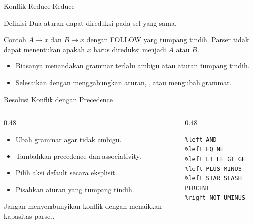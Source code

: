 \documentclass[aspectratio=169,10pt,t]{beamer}
\begin{document}
\begin{frame}{Konflik Reduce-Reduce}
  \begin{block}{Definisi}
    \small
    Dua aturan dapat direduksi pada sel yang sama.
  \end{block}

  \begin{exampleblock}{Contoh}
    \footnotesize
    \(A \to x\) dan \(B \to x\) dengan FOLLOW yang tumpang tindih.
    Parser tidak dapat menentukan apakah \(x\) harus direduksi menjadi
    \(A\) atau \(B\).
  \end{exampleblock}

  \begin{itemize}
    \item Biasanya menandakan grammar terlalu ambigu atau aturan
          tumpang tindih.
    \item Selesaikan dengan menggabungkan aturan, ,
          atau mengubah grammar.
  \end{itemize}
\end{frame}

\begin{frame}[fragile]{Resolusi Konflik dengan Precedence}
  \begin{columns}[T,onlytextwidth]
    \begin{column}{0.48\textwidth}
      \begin{itemize}
        \item Ubah grammar agar tidak ambigu.
        \item Tambahkan precedence dan associativity.
        \item Pilih aksi default secara eksplisit.
        \item Pisahkan aturan yang tumpang tindih.
      \end{itemize}
      \vspace{2pt}
      {\footnotesize\color{ubbblue!80}Jangan menyembunyikan konflik
      dengan menaikkan kapasitas parser.}
    \end{column}
    \begin{column}{0.48\textwidth}
      \begin{lstlisting}[language=Bison,numbers=none,
        caption={Deklarasi precedence pada Bison}]
%left OR
%left AND
%left EQ NE
%left LT LE GT GE
%left PLUS MINUS
%left STAR SLASH PERCENT
%right NOT UMINUS
      \end{lstlisting}
    \end{column}
  \end{columns}
\end{frame}
\end{document}
